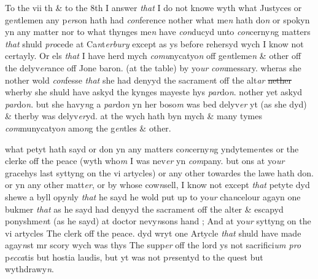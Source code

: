 \documentclass[12pt, a4paper]{book}
\begin{document}
		\ifthenelse{\isodd{\thepage}}
		{\reversemarginpar}
		{\normalmarginpar}
		To the vii th \& to the 8th I answer \textit{that} I do not knowe wyth what Justyces or ge\textit{n}tlemen
any p\textit{er}son hath had \textit{con}ference nother what me\textit{n} hath do\textit{n} or spokyn yn any matter
nor to what thynges me\textit{n} have \textit{con}ducyd unto \textit{con}cerny\textit{n}g matters \textit{that} shuld \textit{pro}cede at
Ca\textit{n}t\textit{erbury} except as ys before rehersyd wych I know not certayly. Or els \textit{that} I have
herd mych \textit{comu}nycatyo\textit{n} off ge\textit{n}tleme\textit{n} \& other off the delyv\textit{er}ance off Jone baron. (at the 
table) by yo\textit{ur}
               \textit{com}messary. wheras she nother wold \textit{con}fesse \textit{that} she had denyyd the
sacrame\textit{n}t off the alt\textit{ar}
               \sout{nether }wherby she shuld have askyd the kynges mayeste hys
\textit{par}do\textit{n}. nother yet askyd \textit{par}do\textit{n}. but she havy\textit{n}g a \textit{par}do\textit{n} yn her boso\textit{m} was bed
delyv\textit{er} yt (as she dyd) \& therby was delyv\textit{er}yd. at the wych hath byn mych
\& many tymes \textit{com}munycatyo\textit{n} amo\textit{n}g the g\textit{en}tles \& other.

 	
				\marginpar[\vspace{0.5cm}{\textcolor{Gray}{10}}]{}
			

		\ifthenelse{\isodd{\thepage}}
		{\reversemarginpar}
		{\normalmarginpar}
		 what petyt hath sayd or don yn any matters co\textit{n}cerny\textit{n}g yndyteme\textit{n}tes or the clerke
off the peace (wyth who\textit{m} I was nev\textit{er} yn \textit{com}pany. but ons at yo\textit{ur} gracehys last
syttyng on the vi artycles) or any other towardes the lawe hath don. or yn
any other matt\textit{er}, or by whose cow\textit{n}sell, I know not except \textit{that} petyte dyd
shewe a byll opy\textit{n}ly \textit{that} he sayd he wold put up to yo\textit{ur} cha\textit{n}celour agayn one
bukmer \textit{that} as he sayd had denyyd the sacrame\textit{n}t off the alter \& escapyd
ponyshme\textit{n}t (as he sayd) at doctor nevy\textit{n}sons hand ; And at yo\textit{ur} syttyng on 
the vi artycles The clerk off the peace. dyd wryt one Artycle \textit{that} 
shuld have made agay\textit{n}st mr scory wych was thys The supp\textit{er} off the lord ys
not sacrifici\textit{um pro} p\textit{ecca}tis but hostia laudis, but yt was not p\textit{re}sentyd to the quest
but wythdrawy\textit{n}.

 	
				\marginpar[\vspace{0.5cm}{\textcolor{Gray}{11}}]{}
			
\end{document}
